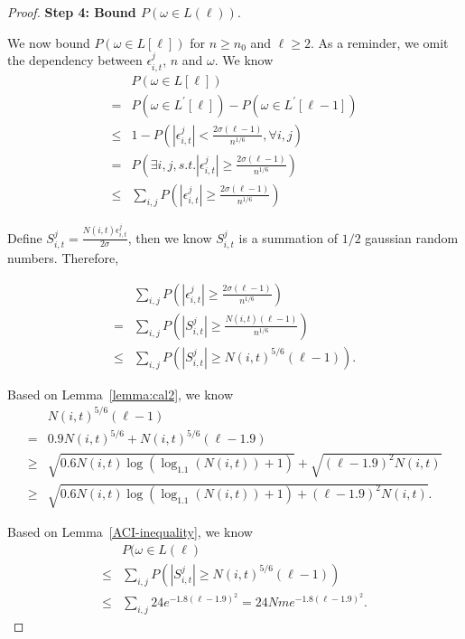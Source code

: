\documentclass[twoside,11pt]{article}
\begin{document}
\begin{proof}
\noindent\textbf{Step 4: Bound $P(\omega\in L(\ell))$}.

We now bound $P(\omega\in L[\ell])$ for $n\geq n_0$ and $\ell\geq 2$. As a reminder, we omit the dependency between $\epsilon_{i,t}^{j}$, $n$ and $\omega$. We know 
\begin{align}
&P(\omega\in L[\ell]) \nonumber \\
=&P(\omega\in L^{'}[\ell])- P(\omega\in L^{'}[\ell-1]) \nonumber \\
\leq & 1-P\left(|\epsilon_{i,t}^{j}|<\frac{2\sigma (\ell-1)}{n^{1/6}}, \forall i,j\right) \nonumber \\
=&P\left(\exists i,j, s.t. |\epsilon_{i,t}^{j}|\geq \frac{2\sigma (\ell-1)}{n^{1/6}}\right) \nonumber  \\
\leq &\sum_{i,j}P\left(|\epsilon_{i,t}^{j}|\geq \frac{2\sigma (\ell-1)}{n^{1/6}}\right) \nonumber
\end{align}

Define $S_{i,t}^{j}=\frac{N(i,t)\epsilon_{i,t}^{j}}{2\sigma}$, then we know $S_{i,t}^{j}$ is a summation of $1/2$ gaussian random numbers. Therefore,

\begin{align}
&\sum_{i,j}P\left(|\epsilon_{i,t}^{j}|\geq \frac{2\sigma(\ell-1)}{n^{1/6}}\right) \nonumber \\ 
=&\sum_{i,j}P\left(|S_{i,t}^{j}|\geq \frac{N(i,t)(\ell-1)}{n^{1/6}}\right) \nonumber \\
\leq &\sum_{i,j}P(|S_{i,t}^{j}|\geq N(i,t)^{5/6}(\ell-1)). \nonumber
\end{align}

Based on Lemma~\ref{lemma:cal2}, we know
\begin{align}
&N(i,t)^{5/6}(\ell-1) \nonumber \\
=& 0.9N(i,t)^{5/6} + N(i,t)^{5/6}(\ell-1.9) \nonumber \\
\geq & \sqrt{0.6N(i,t)\log(\log_{1.1}(N(i,t))+1)} + \sqrt{(\ell-1.9)^2 N(i,t)} \nonumber \\
\geq & \sqrt{0.6N(i,t)\log(\log_{1.1}(N(i,t))+1)+(\ell-1.9)^2 N(i,t)}. \nonumber
\end{align}

Based on Lemma~\ref{ACI-inequality}, we know
\begin{align}
& P(\omega\in L(\ell) \nonumber \\
\leq &\sum_{i,j}P(|S_{i,t}^{j}|\geq N(i,t)^{5/6}(\ell-1)) \nonumber \\
\leq & \sum_{i,j}24e^{-1.8(\ell-1.9)^2} = 24Nme^{-1.8(\ell-1.9)^2}. \nonumber
\end{align}


\end{proof}
\end{document}

